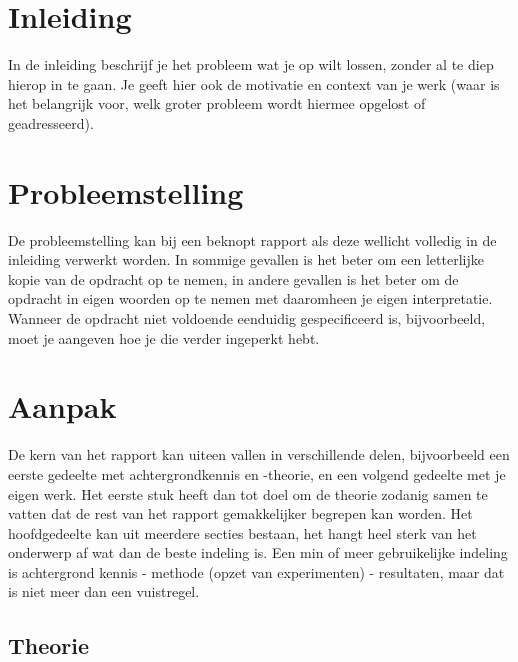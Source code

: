 \documentclass{report}
\begin{document}
\newcommand{\rp}{$\rightarrow$}
\newcommand{\Ohm}{$\Omega$}
\newcommand{\ohm}{$\omega$}
\newcommand{\gmu}{$\mu$}
\newcommand{\tss}{\textsubscript}
\newcommand{\lijst}{}



\chapter{Inleiding}
In de inleiding beschrijf je het probleem wat je op wilt lossen, zonder al te diep hierop in te gaan. Je
geeft hier ook de motivatie en context van je werk (waar is het belangrijk voor, welk groter probleem
wordt hiermee opgelost of geadresseerd).



\chapter{Probleemstelling}
De probleemstelling kan bij een beknopt rapport als deze wellicht volledig in de inleiding verwerkt
worden. In sommige gevallen is het beter om een letterlijke kopie van de opdracht op te nemen, in
andere gevallen is het beter om de opdracht in eigen woorden op te nemen met daaromheen je eigen
interpretatie. Wanneer de opdracht niet voldoende eenduidig gespeciﬁceerd is, bijvoorbeeld, moet je
aangeven hoe je die verder ingeperkt hebt.



\chapter{Aanpak}
De kern van het rapport kan uiteen vallen in verschillende delen, bijvoorbeeld een eerste gedeelte
met achtergrondkennis en -theorie, en een volgend gedeelte met je eigen werk. Het eerste stuk
heeft dan tot doel om de theorie zodanig samen te vatten dat de rest van het rapport gemakkelijker
begrepen kan worden. Het hoofdgedeelte kan uit meerdere secties bestaan, het hangt heel sterk van
het onderwerp af wat dan de beste indeling is. Een min of meer gebruikelijke indeling is achtergrond
kennis - methode (opzet van experimenten) - resultaten, maar dat is niet meer dan een vuistregel.



\section{Theorie}

\end{document}

